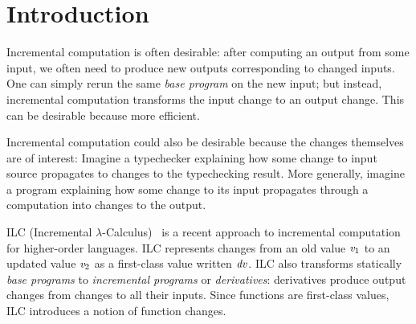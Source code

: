 









\def\deriveDefCore{%
\begin{align*}
  \ensuremath{\Derive{\lambda (\Varid{x}\typcolon\sigma)\to \Varid{t}}} &= \ensuremath{\lambda (\Varid{x}\typcolon\sigma)\;(\Varid{dx}\typcolon\Delta \sigma)\to \Derive{\Varid{t}}} \\
  \ensuremath{\Derive{\Varid{s}\;\Varid{t}}} &= \ensuremath{\Derive{\Varid{s}}\;\Varid{t}\;\Derive{\Varid{t}}} \\
  \ensuremath{\Derive{\Varid{x}}} &= \ensuremath{\Varid{dx}} \\
  \ensuremath{\Derive{\Varid{c}}} &= \ensuremath{\DeriveConst{\Varid{c}}}
\end{align*}
}






\section{Introduction}

Incremental computation is often desirable: after computing an output from some
input, we often need to produce new outputs corresponding to changed inputs. One
can simply rerun the same \emph{base program} on the new input; but instead,
incremental computation transforms the input change to an output change. This
can be desirable because more efficient.

Incremental computation could also be desirable because the changes themselves
are of interest: Imagine a typechecker explaining how some change to input
source propagates to changes to the typechecking result. More generally, imagine
a program explaining how some change to its input propagates through a
computation into changes to the output.

ILC (Incremental $\lambda$-Calculus)~\citep{CaiEtAl2014ILC} is
a recent approach to incremental computation for higher-order languages.
ILC represents changes from an old value \ensuremath{\Varid{v}_{1}} to an updated value \ensuremath{\Varid{v}_{2}} as a
first-class value written \ensuremath{\Varid{dv}}. ILC also transforms statically \emph{base programs}
to \emph{incremental programs} or \emph{derivatives}: derivatives produce
output changes from changes to all their inputs. Since functions are first-class
values, ILC introduces a notion of function changes.

